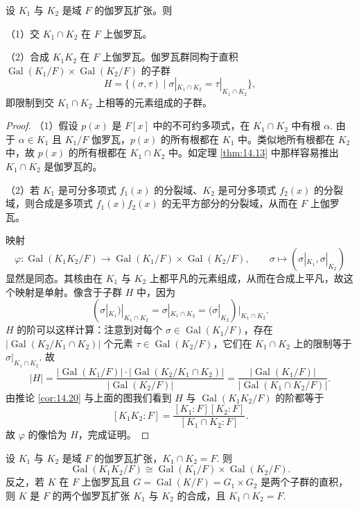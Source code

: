 \begin{proposition}\label{pro:14.21}
设 \(K_1\) 与 \(K_2\) 是域 \(F\) 的伽罗瓦扩张。则

（1）交 \(K_1 \cap K_2\) 在 \(F\) 上伽罗瓦。

（2）合成 \(K_1K_2\) 在 \(F\) 上伽罗瓦。伽罗瓦群同构于直积 \(\operatorname{Gal}(K_1/F) \times \operatorname{Gal}(K_2/F)\) 的子群
\[
H = \{(\sigma, \tau) \mid \sigma|_{K_1 \cap K_2} = \tau|_{K_1 \cap K_2}\},
\]
即限制到交 \(K_1 \cap K_2\) 上相等的元素组成的子群。
\end{proposition}

\begin{proof}
（1）假设 \(p(x)\) 是 \(F[x]\) 中的不可约多项式，在 \(K_1 \cap K_2\) 中有根 \(\alpha\). 由于 \(\alpha \in K_1\) 且 \(K_1/F\) 伽罗瓦，\(p(x)\) 的所有根都在 \(K_1\) 中。类似地所有根都在 \(K_2\) 中，故 \(p(x)\) 的所有根都在 \(K_1 \cap K_2\) 中。如定理 \ref{thm:14.13} 中那样容易推出 \(K_1 \cap K_2\) 是伽罗瓦的。

（2）若 \(K_1\) 是可分多项式 \(f_1(x)\) 的分裂域、\(K_2\) 是可分多项式 \(f_2(x)\) 的分裂域，则合成是多项式 \(f_1(x)f_2(x)\) 的无平方部分的分裂域，从而在 \(F\) 上伽罗瓦。

映射
\[
\varphi : \operatorname{Gal}(K_1K_2/F) \to \operatorname{Gal}(K_1/F) \times \operatorname{Gal}(K_2/F), \qquad \sigma \mapsto (\sigma|_{K_1}, \sigma|_{K_2})
\]
显然是同态。其核由在 \(K_1\) 与 \(K_2\) 上都平凡的元素组成，从而在合成上平凡，故这个映射是单射。像含于子群 \(H\) 中，因为
\[
(\sigma|_{K_1})|_{K_1 \cap K_2} = \sigma|_{K_1 \cap K_2} = (\sigma|_{K_2})|_{K_1 \cap K_2}.
\]
\(H\) 的阶可以这样计算：注意到对每个 \(\sigma \in \operatorname{Gal}(K_1/F)\)，存在 \(|\operatorname{Gal}(K_2/K_1 \cap K_2)|\) 个元素 \(\tau \in \operatorname{Gal}(K_2/F)\)，它们在 \(K_1 \cap K_2\) 上的限制等于 \(\sigma|_{K_1 \cap K_2}\). 故
\[
|H| = \frac{|\operatorname{Gal}(K_1/F)| \cdot |\operatorname{Gal}(K_2/K_1 \cap K_2)|}{|\operatorname{Gal}(K_2/F)|} = \frac{|\operatorname{Gal}(K_1/F)|}{|\operatorname{Gal}(K_1 \cap K_2/F)|}.
\]
由推论 \ref{cor:14.20} 与上面的图我们看到 \(H\) 与 \(\operatorname{Gal}(K_1K_2/F)\) 的阶都等于
\[
[K_1K_2:F] = \frac{[K_1:F][K_2:F]}{[K_1 \cap K_2:F]}.
\]
故 \(\varphi\) 的像恰为 \(H\)，完成证明。
\end{proof}

\begin{corollary}\label{cor:14.22}
设 \(K_1\) 与 \(K_2\) 是域 \(F\) 的伽罗瓦扩张，\(K_1 \cap K_2 = F\). 则
\[
\operatorname{Gal}(K_1K_2/F) \cong \operatorname{Gal}(K_1/F) \times \operatorname{Gal}(K_2/F).
\]
反之，若 \(K\) 在 \(F\) 上伽罗瓦且 \(G = \operatorname{Gal}(K/F) = G_1 \times G_2\) 是两个子群的直积，则 \(K\) 是 \(F\) 的两个伽罗瓦扩张 \(K_1\) 与 \(K_2\) 的合成，且 \(K_1 \cap K_2 = F\).
\end{corollary}

